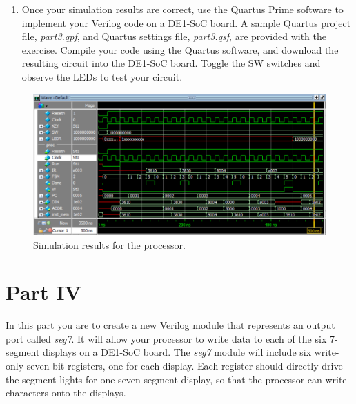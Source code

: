 \documentclass[epsfig,10pt,fullpage]{article}
\begin{document}
\begin{enumerate}
\begin{figure}[H]
\begin{center}
\begin{minipage}[h]{12.5 cm}
\begin{lstlisting}[name=proc]
// Read SW switches and display on LEDs
			mvt	r3, #LED_ADDRESS	// point to LED port
			mvt	r4, #SW_ADDRESS	// point to SW port
MAIN:		ld		r0, [r4]				// read SW values
			st		r0, [r3]				// light up LEDs
			mv 	pc, #MAIN
\end{lstlisting}
\end{minipage}
\caption{Assembly-language program that uses {\it ld} and {\it st} instructions.}
\label{fig:assembly}
\end{center}
\end{figure}

An example result produced by using {\it ModelSim} for a correctly-designed circuit 
is given in Figure~\ref{fig:part3}. It shows the execution of the first four instructions
in Figure~\ref{fig:assembly}.

\item Once your simulation results are correct, use the Quartus Prime software to implement your
Verilog code on a DE1-SoC board. A sample Quartus project file, {\it part3.qpf}, and Quartus
settings file, {\it part3.qsf}, are provided with the exercise. Compile your code using the 
Quartus software, and download the resulting circuit 
into the DE1-SoC board. Toggle the SW switches and observe the LEDs to test your circuit.
\end{enumerate}

\begin{figure}[H]
	\begin{center}
		\includegraphics[width=\textwidth]{figures/part3.png}
	\end{center}
	\caption{Simulation results for the processor.}
	\label{fig:part3}
\end{figure}

\section*{Part IV}
In this part you are to create a new Verilog module that represents an output port called 
{\it seg7}. It will allow your processor to write data to each of the six 7-segment displays on a 
DE1-SoC board. The {\it seg7} module will include six write-only seven-bit registers,
one for each display. Each register should directly drive the segment lights for one 
seven-segment display, so that the processor can write characters onto the displays. 
\end{document}
